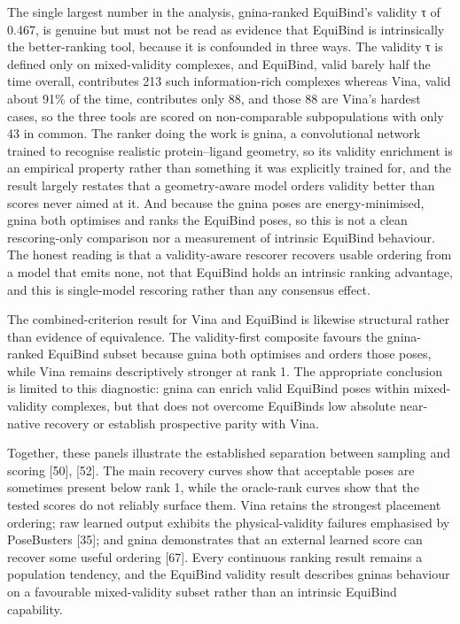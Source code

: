 The single largest number in the analysis, gnina-ranked EquiBind's validity τ of 0.467, is genuine but must not be read as evidence that EquiBind is intrinsically the better-ranking tool, because it is confounded in three ways. The validity τ is defined only on mixed-validity complexes, and EquiBind, valid barely half the time overall, contributes 213 such information-rich complexes whereas Vina, valid about 91\% of the time, contributes only 88, and those 88 are Vina's hardest cases, so the three tools are scored on non-comparable subpopulations with only 43 in common. The ranker doing the work is gnina, a convolutional network trained to recognise realistic protein--ligand geometry, so its validity enrichment is an empirical property rather than something it was explicitly trained for, and the result largely restates that a geometry-aware model orders validity better than scores never aimed at it. And because the gnina poses are energy-minimised, gnina both optimises and ranks the EquiBind poses, so this is not a clean rescoring-only comparison nor a measurement of intrinsic EquiBind behaviour. The honest reading is that a validity-aware rescorer recovers usable ordering from a model that emits none, not that EquiBind holds an intrinsic ranking advantage, and this is single-model rescoring rather than any consensus effect.

The combined-criterion result for Vina and EquiBind is likewise structural rather than evidence of equivalence. The validity-first composite favours the gnina-ranked EquiBind subset because gnina both optimises and orders those poses, while Vina remains descriptively stronger at rank 1. The appropriate conclusion is limited to this diagnostic: gnina can enrich valid EquiBind poses within mixed-validity complexes, but that does not overcome EquiBind\textquotesingle s low absolute near-native recovery or establish prospective parity with Vina.

Together, these panels illustrate the established separation between sampling and scoring {[}50{]}, {[}52{]}. The main recovery curves show that acceptable poses are sometimes present below rank 1, while the oracle-rank curves show that the tested scores do not reliably surface them. Vina retains the strongest placement ordering; raw learned output exhibits the physical-validity failures emphasised by PoseBusters {[}35{]}; and gnina demonstrates that an external learned score can recover some useful ordering {[}67{]}. Every continuous ranking result remains a population tendency, and the EquiBind validity result describes gnina\textquotesingle s behaviour on a favourable mixed-validity subset rather than an intrinsic EquiBind capability.

